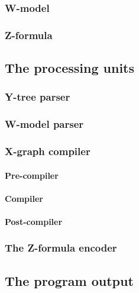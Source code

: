 \subsubsection{W-model}

\subsubsection{Z-formula}


\subsection{The processing units} %

\subsubsection{Y-tree parser}

\subsubsection{W-model parser}

\subsubsection{X-graph compiler}

\paragraph{Pre-compiler}
\paragraph{Compiler}
\paragraph{Post-compiler}

\subsubsection{The Z-formula encoder}


\subsection{The program output}


